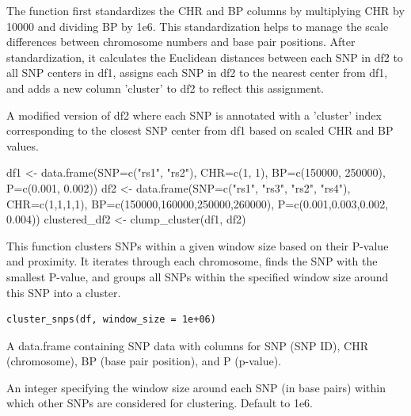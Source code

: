 \documentclass[a4paper]{book}
\begin{document}
%
\begin{Details}
The function first standardizes the CHR and BP columns by multiplying CHR by 10000 and dividing BP by 1e6.
This standardization helps to manage the scale differences between chromosome numbers and base pair positions.
After standardization, it calculates the Euclidean distances between each SNP in df2 to all SNP centers in df1,
assigns each SNP in df2 to the nearest center from df1, and adds a new column 'cluster' to df2 to reflect this assignment.
\end{Details}
%
\begin{Value}
A modified version of df2 where each SNP is annotated with a 'cluster' index corresponding to the closest
SNP center from df1 based on scaled CHR and BP values.
\end{Value}
%
\begin{Examples}
\begin{ExampleCode}
df1 <- data.frame(SNP=c("rs1", "rs2"), CHR=c(1, 1), BP=c(150000, 250000), P=c(0.001, 0.002))
df2 <- data.frame(SNP=c("rs1", "rs3", "rs2", "rs4"), CHR=c(1,1,1,1),
                  BP=c(150000,160000,250000,260000),
                  P=c(0.001,0.003,0.002, 0.004))
clustered_df2 <- clump_cluster(df1, df2)

\end{ExampleCode}
\end{Examples}
%
\begin{Description}
This function clusters SNPs within a given window size based on their P-value and proximity. It iterates through
each chromosome, finds the SNP with the smallest P-value, and groups all SNPs within the specified window size
around this SNP into a cluster.
\end{Description}
%
\begin{Usage}
\begin{verbatim}
cluster_snps(df, window_size = 1e+06)
\end{verbatim}
\end{Usage}
%
\begin{Arguments}
\begin{ldescription}
\item[\code{df}] A data.frame containing SNP data with columns for SNP (SNP ID), CHR (chromosome), BP (base pair position), and P (p-value).

\item[\code{window\_size}] An integer specifying the window size around each SNP (in base pairs) within which other SNPs are considered for clustering. Default to 1e6.
\end{ldescription}
\end{Arguments}
\end{document}
